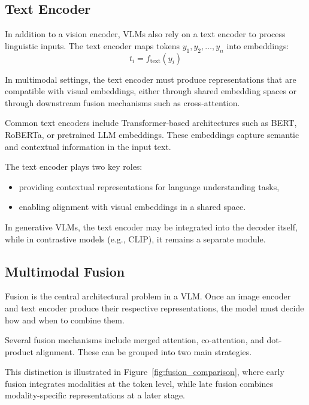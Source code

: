 \documentclass{article}
\begin{document}
\subsection{Text Encoder}

In addition to a vision encoder, VLMs also rely on a text encoder to process linguistic inputs. The text encoder maps tokens $y_1, y_2, \dots, y_n$ into embeddings:
\[
t_i = f_{\text{text}}(y_i)
\]

In multimodal settings, the text encoder must produce representations that are compatible with visual embeddings, either through shared embedding spaces or through downstream fusion mechanisms such as cross-attention.

Common text encoders include Transformer-based architectures such as BERT, RoBERTa, or pretrained LLM embeddings. These embeddings capture semantic and contextual information in the input text.

The text encoder plays two key roles:
\begin{itemize}
    \item providing contextual representations for language understanding tasks,
    \item enabling alignment with visual embeddings in a shared space.
\end{itemize}

In generative VLMs, the text encoder may be integrated into the decoder itself, while in contrastive models (e.g., CLIP), it remains a separate module.


\subsection{Multimodal Fusion}

Fusion is the central architectural problem in a VLM. Once an image encoder and text encoder produce their respective representations, the model must decide how and when to combine them.

Several fusion mechanisms include merged attention, co-attention, and dot-product alignment. These can be grouped into two main strategies.

This distinction is illustrated in Figure~\ref{fig:fusion_comparison}, where early fusion integrates modalities at the token level, while late fusion combines modality-specific representations at a later stage.
\end{document}
